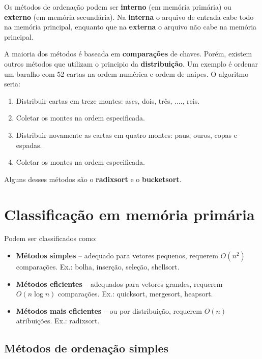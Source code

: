Os métodos de ordenação podem ser {\bf interno} (em memória primária) ou {\bf externo} (em memória secundária).
Na {\bf interna} o arquivo de entrada cabe todo na memória principal, enquanto
que na {\bf externa} o arquivo não cabe na memória principal. 

A maioria dos métodos é baseada em {\bf comparações} de chaves.
Porém, existem outros métodos que utilizam o principio da {\bf distribuição}. 
Um exemplo é ordenar um baralho com 52 cartas na ordem numérica e ordem de naipes.
O algoritmo seria:
\begin{enumerate}
\item Distribuir cartas em treze montes: ases, dois, três, ...., reis.
\item Coletar os montes na ordem especificada.
\item Distribuir novamente as cartas em quatro montes: paus, ouros, copas e espadas.
\item Coletar os montes na ordem especificada.
\end{enumerate}
Alguns desses métodos são o {\bf radixsort} e o {\bf bucketsort}.

\chapter{Classificação em memória primária}

Podem ser classificados como:
\begin{itemize}
\item {\bf Métodos simples} -- adequado para vetores pequenos, requerem $O(n^2)$ comparações.
Ex.: bolha, inserção, seleção, shellsort.
\item {\bf Métodos eficientes} -- adequados para vetores grandes, requerem $O(n \log n)$ comparações.
Ex.: quicksort, mergesort, heapsort.
\item {\bf Métodos mais eficientes} -- ou por distribuição, requerem $O(n)$ atribuições. Ex.: radixsort.
\end{itemize}

\section{Métodos de ordenação simples}

